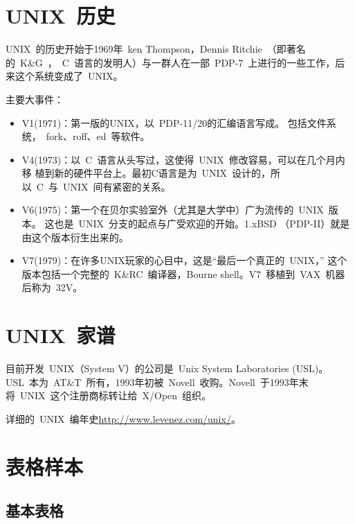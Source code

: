 \documentclass[../Main/thesis.tex]{subfiles}
\begin{document}
\section{UNIX~历史}
\label{sec:history}
UNIX~的历史开始于1969年~ken Thompson，Dennis Ritchie~（即著名的~K\&G~，~C~语言的发明人）与一群人在一部~PDP-7~上进行的一些工作，后来这个系统变成了~UNIX。

主要大事件：
\begin{itemize}
  \item V1(1971)：第一版的UNIX，以~PDP-11/20的汇编语言写成。
        包括文件系统，~fork、roff、ed~等软件。
  \item V4(1973)：以~C~语言从头写过，这使得~UNIX~修改容易，可以在几个月内移
        植到新的硬件平台上。最初C语言是为~UNIX~设计的，所以~C~与~UNIX~间有紧密的关系。
  \item V6(1975)：第一个在贝尔实验室外（尤其是大学中）广为流传的~UNIX~版本。
        这也是~UNIX~分支的起点与广受欢迎的开始。1.xBSD （PDP-II）就是由这个版本衍生出来的。
  \item V7(1979)：在许多UNIX玩家的心目中，这是“最后一个真正的~UNIX，”
        这个版本包括一个完整的~K\&RC~编译器，Bourne
        shell。V7~移植到~VAX~机器后称为~32V。
\end{itemize}

\section{UNIX~家谱}
目前开发~UNIX（System V）的公司是~Unix System Laboratories (USL)。USL~本为~AT\&T~所有，1993年初被~Novell~收购。Novell~于1993年末将~UNIX~这个注册商标转让给~X/Open~组织。

\label{sec:family}

详细的~UNIX~编年史\url{http://www.levenez.com/unix/}。

\section{表格样本}
\label{chap1:sample:table}

\subsection{基本表格}
\label{sec:basictable}
\end{document}
